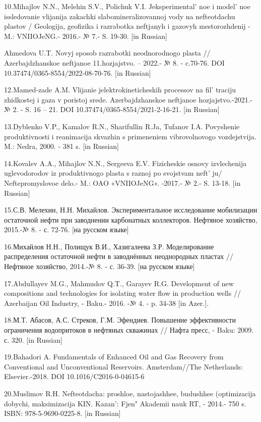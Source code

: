 10.Mihajlov N.N., Melehin S.V., Polichuk V.I.
Jeksperimental' noe i model' noe
issledovanie vlijanija zakachki slabomineralizovannoj vody na
nefteotdachu plastov / Geologija, geofizika i razrabotka neftjanyh i
gazovyh mestorozhdenij -M.: VNIIOJeNG.- 2016.- № 7.- S. 19-30. {[}in
Russian{]}

Ahmedova U.T. Novyj sposob razrabotki neodnorodnogo plasta //
Azerbajdzhanskoe neftjanoe 11.hozjajstvo. -- 2022.- № 8. - c.70-76. DOI
10.37474/0365-8554/2022-08-70-76. {[}in Russian{]}

12.Mamed-zade A.M. Vlijanie jelektrokineticheskih processov na
fil' traciju zhidkostej i gaza v poristoj srede.
Azerbajdzhanskoe neftjanoe hozjajstvo.-2021.- № 2. - S. 16 -- 21. DOI
10.37474/0365-8554/2021-2-16-21. {[}in Russian{]}

13.Dyblenko V.P., Kamalov R.N., Sharifullin R.Ja, Tufanov I.A.
Povyshenie produktivnosti i reanimacija skvazhin s primeneniem
vibrovolnovogo vozdejstvija. M.: Nedra, 2000. - 381 s. {[}in Russian{]}

14.Kovalev A.A., Mihajlov N.N., Sergeeva E.V. Fizicheskie osnovy
izvlechenija uglevodorodov iz produktivnogo plasta s raznoj po svojstvam
neft' ju/ Neftepromyslovoe delo.- M.: OAO «VNIIOJeNG».
-2017.- № 2.- S. 13-18. {[}in Russian{]}

15.С.В. Мелехин, Н.Н. Михайлов. Экспериментальное исследование
мобилизации остаточной нефти при заводнении карбонатных коллекторов.
Нефтяное хозяйство, 2015.-№ 8. - с. 72-76. {[}на русском языке{]}

16.Михайлов Н.Н., Полищук В.И., Хазигалеева З.Р. Моделирование
распределения остаточной нефти в заводнённых неоднородных пластах //
Нефтяное хозяйство, 2014.-№ 8. - с. 36-39. {[}на русском языке{]}

17.Abdullayev M.G., Mahmudov Q.T., Garayev R.G. Development of new
compositions and technologies for isolating water flow in production
wells // Azerbaijan Oil Industry, - Baku.- 2016. -№ 4. - p. 34-38 {[}in
Azer.{]}.

18.М.Т. Абасов, А.С. Стреков, Г.М. Эфендиев. Повышение эффективности
ограничения водопритоков в нефтяных скважинах // Нафта пресс, - Baku:
2009. с. 320. {[}in Russian{]}

19.Bahadori A. Fundamentals of Enhanced Oil and Gas Recovery from
Conventional and Unconventional Reservoirs. Amsterdam//The Netherlands:
Elsevier.-2018. DOI 10.1016/C2016-0-04615-6

20.Muslimov R.H. Nefteotdacha: proshloe, nastojashhee, budushhee
(optimizacija dobychi, maksimizacija KIN. Kazan': Fjen"
Akademii nauk RT, - 2014.- 750 s. ISBN: 978-5-9690-0225-8. {[}in
Russian{]}

